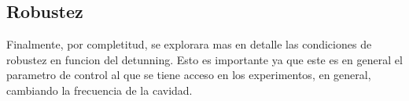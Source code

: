\subsection{Robustez}
Finalmente, por completitud, se explorara mas en detalle las condiciones de robustez en funcion del detunning. Esto es importante ya que este es en general el parametro de control al que se tiene acceso en los experimentos, en general, cambiando la frecuencia de la cavidad.



